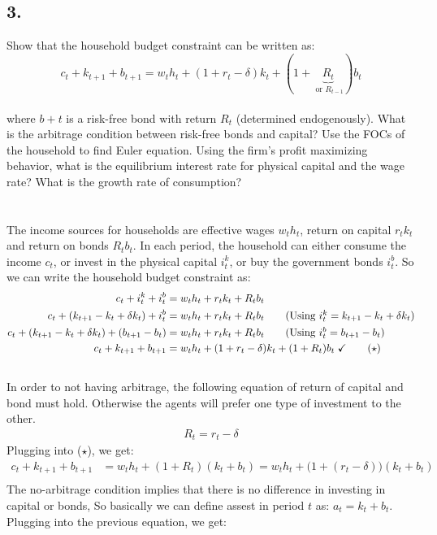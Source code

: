 \documentclass[12pt]{extarticle}
\def\secondarycolor{Golden}
\newcommand{\problem}[1]{
    \subsection*{\textcolor{\secondarycolor}{#1}}
    \addcontentsline{toc}{subsection}{\protect\numberline{}#1}
}
\newcommand{\ones}{$\star$}
\begin{document}
\newpage
\problem{3.}Show that the household budget constraint can be written as:
$$c_t + k_{t+1} + b_{t+1} = w_t h_t + (1 + r_t - \delta) k_t + (1 + \underbrace{R_t}_{\text{ or } R_{t-1}}  ) b_t$$\\
where $b+t$ is a risk-free bond with return $R_t$ (determined endogenously).
What is the arbitrage condition between risk-free bonds and capital?
Use the FOCs of the household to find Euler equation.
Using the firm’s profit maximizing behavior, what is the equilibrium interest rate for physical capital and the wage rate?
What is the growth rate of consumption?\\\\\\
The income sources for households are effective wages $w_th_t$, return on capital $r_tk_t$ and return on bonds $R_tb_t$. In each period, the household can either consume the income $c_t$,
or invest in the physical capital $i_t^k$,
or buy the government bonds $i_t^b$.
So we can write the household budget constraint as:
\begin{align*}
    c_t + i_t^k + i_t^b &= w_t h_t + r_t k_t + R_t b_t \\
    c_t + (k_{t+1}-k_t+\delta k_t) + i_t^b &= w_t h_t + r_t k_t + R_t b_t \tag{Using $i_t^k=k_{t+1}-k_t+\delta k_t$}\\
    c_t + (k_{t+1}-k_t+\delta k_t) + (b_{t+1}-b_t) &= w_t h_t + r_t k_t + R_t b_t \tag{Using $i_t^b=b_{t+1}-b_t$}\\
    c_t + k_{t+1} + b_{t+1} &= w_t h_t + (1 + r_t - \delta) k_t + (1 + R_t) b_t\; \checkmark \tag{\ones}\\
\end{align*}\\
In order to not having arbitrage, the following equation of return of capital and bond must hold.
Otherwise the agents will prefer one type of investment to the other.
\begin{align*}
    R_t = r_t - \delta
\end{align*}
Plugging into (\ones), we get:
\begin{align*}
    c_t + k_{t+1} + b_{t+1} &= w_t h_t + (1 + R_t) (k_t+b_t)=w_t h_t + \bigl(1 + (r_t-\delta)\bigr) (k_t+b_t)\\
\end{align*}
The no-arbitrage condition implies that there is no difference in investing in capital or bonds,
So basically we can define assest in period $t$ as: $a_t=k_t+b_t$. Plugging into the previous equation, we get:
\end{document}
